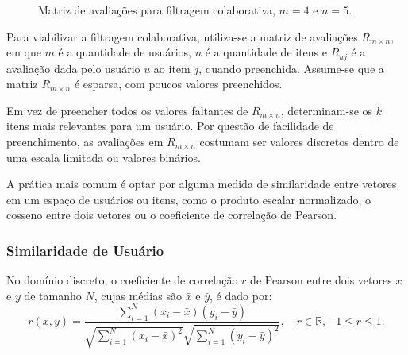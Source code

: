 \begin{figure}[h!]
    \centering
    \caption{Matriz de avaliações para filtragem colaborativa, $m=4$ e $n=5$.}
    \label{fig:ratings_matrix}
\end{figure}

Para viabilizar a filtragem colaborativa, utiliza-se a matriz de avaliações
$R_{m \times n}$, em que $m$ é a quantidade de usuários, $n$ é a quantidade de
itens e $R_{uj}$ é a avaliação dada pelo usuário $u$ ao item $j$, quando
preenchida. Assume-se que a matriz $R_{m \times n}$ é esparsa, com poucos
valores preenchidos.

Em vez de preencher todos os valores faltantes de $R_{m \times n}$,
determinam-se os $k$ itens mais relevantes para um usuário. Por questão de
facilidade de preenchimento, as avaliações em $R_{m \times n}$ costumam ser
valores discretos dentro de uma escala limitada ou valores binários.

A prática mais comum é optar por alguma medida de similaridade entre vetores em
um espaço de usuários ou itens, como o produto escalar normalizado, o cosseno
entre dois vetores ou o coeficiente de correlação de Pearson.

\subsubsection{Similaridade de Usuário}
No domínio discreto, o coeficiente de correlação $r$ de Pearson entre dois vetores $x$ e $y$ de
tamanho $N$, cujas médias são $\bar{x}$ e $\bar{y}$, é dado por:
\begin{equation}    
    r(x,y) = \frac{\sum_{i=1}^{N}(x_i - \bar{x})(y_i - \bar{y})}{\sqrt{\sum_{i=1}^{N}(x_i - \bar{x})^2} \sqrt{\sum_{i=1}^{N}(y_i - \bar{y})^2}}, \quad r \in \mathbb{R}, -1 \leq r \leq 1.
\end{equation}

